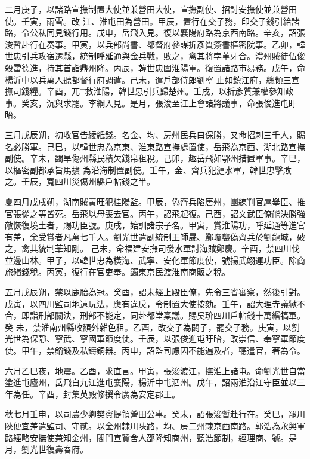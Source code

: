 \begin{pinyinscope}
 二月庚子，以諸路宣撫制置大使並兼營田大使，宣撫副使、招討安撫使並兼營田使。壬寅，雨雪。改
 江、淮屯田為營田。甲辰，置行在交子務，印交子錢引給諸路，令公私同見錢行用。戊申，岳飛入見。復以襄陽府路為京西南路。辛亥，詔張浚暫赴行在奏事。甲寅，以兵部尚書、都督府參謀折彥質簽書樞密院事。乙卯，韓世忠引兵攻宿遷縣，統制呼延通與金兵戰，敗之，禽其將孛堇牙合。澧州賊徒伍俊殺雷德進，持其首詣鼎州降。丙辰，韓世忠圍淮陽軍。復置諸路市易務。戊午，命楊沂中以兵萬人聽都督行府調遣。己未，遣戶部侍郎劉寧
 止如鎮江府，總領三宣撫司錢糧。辛酉，兀□救淮陽，韓世忠引兵歸楚州。壬戌，以折彥質兼權參知政事。癸亥，沉與求罷。李綱入見。是月，張浚至江上會諸將議事，命張俊進屯盱眙。



 三月戊辰朔，初收官告綾紙錢。名金、均、房州民兵曰保勝，又命招刺三千人，賜名必勝軍。己巳，以韓世忠為京東、淮東路宣撫處置使，岳飛為京西、湖北路宣撫副使。辛未，蠲旱傷州縣民積欠錢帛租稅。己卯，趣岳飛如鄂州措置軍事。辛巳，以樞密副都承旨馬擴
 為沿海制置副使。壬午，金、齊兵犯漣水軍，韓世忠擊敗之。壬辰，寬四川災傷州縣戶帖錢之半。



 夏四月戊戌朔，湖南賊黃旺犯桂陽監。甲辰，偽齊兵陷唐州，團練判官扈舉臣、推官張從之等皆死。岳飛以母喪去官。丙午，詔飛起復。己酉，詔文武臣僚能決勝強敵恢復境土者，賜功臣號。庚戌，始訓諸宗子名。甲寅，賞淮陽功，呼延通等進官有差，余受賞者凡萬七千人。劉光世遣副統制王師晟、酈瓊襲偽齊兵於劉龍城，破之，禽其統制華知剛。
 己未，命福建安撫司發水軍討海賊鄭慶。辛酉，禁四川伐並邊山林。甲子，以韓世忠為橫海、武寧、安化軍節度使，號揚武翊運功臣。除商旅緡錢稅。丙寅，復行在官吏奉。蠲東京民渡淮南商販之稅。



 五月戊辰朔，禁以鹿胎為冠。癸酉，詔未經上殿臣僚，先令三省審察，然後引對。戊寅，以四川監司地遠玩法，應有違戾，令制置大使按劾。壬午，詔大理寺議獄不合，即詣刑部關決，刑部不能定，同赴都堂稟議。賜吳玠四川戶帖錢十萬緡犒軍。癸
 未，禁淮南州縣收額外雜色租。乙酉，改交子為關子，罷交子務。庚寅，以劉光世為保靜、寧武、寧國軍節度使。壬辰，以張俊進屯盱眙，改崇信、奉寧軍節度使。甲午，禁銷錢及私鑄銅器。丙申，詔監司慮囚不能遍及者，聽遣官，著為令。



 六月乙巳夜，地震。乙酉，求直言。甲寅，張浚渡江，撫淮上諸屯。命劉光世自當塗進屯廬州，岳飛自九江進屯襄陽，楊沂中屯泗州。戊午，詔兩淮沿江守臣並以三年為任。辛酉，封集英殿修撰令廣為安定郡王。



 秋七月壬申，以司農少卿樊賓提領營田公事。癸未，詔張浚暫赴行在。癸巳，罷川陜便宜差遣監司、守貳。以金州隸川陜路，均、房二州隸京西南路。郭浩為永興軍路經略安撫使兼知金州，閣門宣贊舍人邵隆知商州，聽浩節制，經理商、虢。是月，劉光世復壽春府。




\end{pinyinscope}

